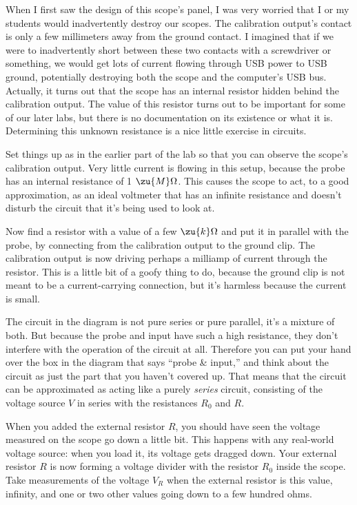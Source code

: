 
When I first saw the design of this scope's panel, I was very worried that I or
my students would inadvertently destroy our scopes. The calibration output's contact is only
a few millimeters away from the ground contact. I imagined that if we were to inadvertently
short between these two contacts with a screwdriver or something, we would get lots of
current flowing through USB power to USB ground, potentially destroying both the
scope and the computer's USB bus. Actually, it turns out that the scope has an internal
resistor hidden behind the calibration output. The value of this resistor turns out to
be important for some of our later labs, but there is no documentation on its existence
or what it is. Determining this unknown resistance is a nice little exercise in circuits.

Set things up as in the earlier part of the lab so that you can observe the
scope's calibration output. Very little current is flowing in this setup, because
the probe has an internal resistance of 1 $\zu{M}\Omega$. This causes the scope to act,
to a good approximation, as an ideal voltmeter that has an infinite resistance and
doesn't disturb the circuit that it's being used to look at.

Now find a resistor with a value of a few $\zu{k}\Omega$ and put it in parallel with
the probe, by connecting from the calibration output to the ground clip. The calibration
output is now driving perhaps a milliamp of current through the resistor. This is a little
bit of a goofy thing to do, because the ground clip is not meant to be a current-carrying
connection, but it's harmless because the current is small.


The circuit in the diagram is not pure series or pure parallel, it's a mixture of both.
But because the probe and input have such a high resistance, they don't interfere with
the operation of the circuit at all. Therefore you can put your hand over the box in
the diagram that says ``probe \& input,'' and think about the circuit as just the
part that you haven't covered up. That means that the circuit can be approximated as acting like a purely
\emph{series} circuit, consisting of the voltage source $V$ in series with the resistances
$R_0$ and $R$.

When you added the external resistor $R$, you should have seen the voltage measured on the scope go
down a little bit. This happens with any real-world voltage source: when you load it,
its voltage gets dragged down. Your external resistor $R$ is now forming a voltage divider
with the resistor $R_0$ inside the scope. Take measurements of the voltage $V_R$ when the external
resistor is this value, infinity, and one or two other values going down to a few hundred
ohms.


